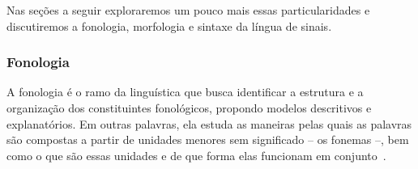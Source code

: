 


Nas seções a seguir exploraremos um pouco mais essas particularidades e discutiremos a fonologia, morfologia e sintaxe da língua de sinais.


\subsubsection{Fonologia}
\label{linguistica-gramatica-fonologia}

A fonologia é o ramo da linguística que busca identificar a estrutura e a organização dos constituintes fonológicos, propondo  modelos descritivos e explanatórios. Em outras palavras, ela estuda as maneiras pelas quais as palavras são compostas a partir de unidades menores sem significado -- os fonemas --, bem como o que são essas unidades e de que forma elas funcionam em conjunto~\cite{quadros-2004-estudos-linguisticos,hill-2019-sign-languages}.


